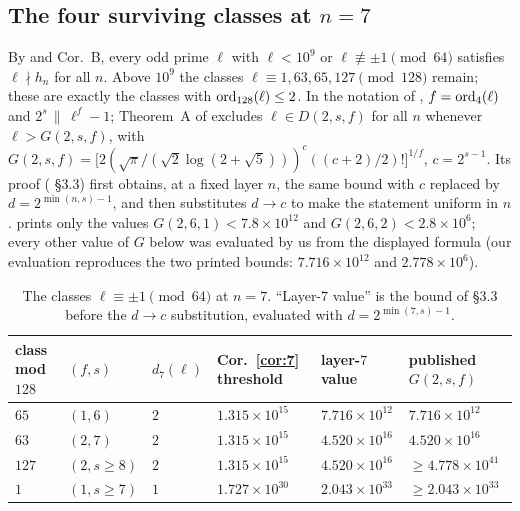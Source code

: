 \documentclass[11pt]{amsart}
\theoremstyle{remark}\newtheorem{remark}[theorem]{Remark}
\theoremstyle{definition}\newtheorem{definition}[theorem]{Definition}
\begin{document}
\subsection{The four surviving classes at $n=7$}\label{sec:classes}
By \cite{FK3} and \cite{MO16} Cor.~B, every odd prime $\ell$ with $\ell<10^9$ or $\ell\not\equiv\pm1\pmod{64}$ satisfies $\ell\nmid h_n$ for all $n$. Above $10^9$ the classes $\ell\equiv1,63,65,127\pmod{128}$ remain; these are exactly the classes with $\operatorname{ord}_{128}(\ell)\le2$. In the notation of \cite{MO16}, $f=\operatorname{ord}_4(\ell)$ and $2^s\,\|\,\ell^f-1$; Theorem~A of \cite{MO16} excludes $\ell\in D(2,s,f)$ for all $n$ whenever $\ell>G(2,s,f)$, with $G(2,s,f)=\big[2(\sqrt\pi/(\sqrt2\log(2+\sqrt5)))^{c}((c+2)/2)!\big]^{1/f}$, $c=2^{s-1}$. Its proof (\cite{MO16} \S3.3) first obtains, at a fixed layer $n$, the same bound with $c$ replaced by $d=2^{\min(n,s)-1}$, and then substitutes $d\to c$ to make the statement uniform in $n$. \cite{MO16} prints only the values $G(2,6,1)<7.8\times10^{12}$ and $G(2,6,2)<2.8\times10^6$; every other value of $G$ below was evaluated by us from the displayed formula (our evaluation reproduces the two printed bounds: $7.716\times10^{12}$ and $2.778\times10^6$).
\begin{table}[h]\footnotesize
\begin{tabular}{@{}p{1.5cm}p{1.4cm}p{0.9cm}p{2.2cm}p{2.2cm}p{2.4cm}@{}}\toprule
class mod $128$ & $(f,s)$ & $d_7(\ell)$ & Cor.~\ref{cor:7} threshold & \cite{MO16} layer-$7$ value & \cite{MO16} published $G(2,s,f)$\\ \midrule
$65$ & $(1,6)$ & $2$ & $1.315\times10^{15}$ & $7.716\times10^{12}$ & $7.716\times10^{12}$\\
$63$ & $(2,7)$ & $2$ & $1.315\times10^{15}$ & $4.520\times10^{16}$ & $4.520\times10^{16}$\\
$127$ & $(2,s\ge8)$ & $2$ & $1.315\times10^{15}$ & $4.520\times10^{16}$ & $\ge4.778\times10^{41}$\\
$1$ & $(1,s\ge7)$ & $1$ & $1.727\times10^{30}$ & $2.043\times10^{33}$ & $\ge2.043\times10^{33}$\\
\bottomrule\end{tabular}
\caption{The classes $\ell\equiv\pm1\pmod{64}$ at $n=7$. ``Layer-$7$ value'' is the bound of \cite{MO16} \S3.3 before the $d\to c$ substitution, evaluated with $d=2^{\min(7,s)-1}$.}\label{tab:classes}
\end{table}
\end{document}
